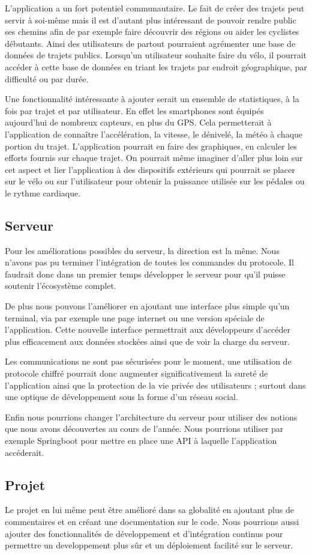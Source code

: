 L'application a un fort potentiel communautaire. Le fait de créer des trajets peut servir à soi-même mais il est d'autant plus intéressant
de pouvoir rendre public ses chemins afin de par exemple faire découvrir des régions ou aider les cyclistes débutants. Ainsi des utilisateurs
de partout pourraient agrémenter une base de données de trajets publics. Lorsqu'un utilisateur souhaite faire du vélo, il pourrait accéder
à cette base de données en triant les trajets par endroit géographique, par difficulté ou par durée.

Une fonctionnalité intéressante à ajouter serait un ensemble de statistiques, à la fois par trajet et par utilisateur. En effet les smartphones
sont équipés aujourd'hui de nombreux capteurs, en plus du GPS. Cela permetterait à l'application de connaître l'accélération, la vitesse, le
dénivelé, la météo à chaque portion du trajet. L'application pourrait en faire des graphiques, en calculer les efforts fournis sur chaque trajet.
On pourrait même imaginer d'aller plus loin sur cet aspect et lier l'application à des dispositifs extérieurs qui pourrait se placer sur le
vélo ou sur l'utilisateur pour obtenir la puissance utilisée sur les pédales ou le rythme cardiaque.
\subsection{Serveur}
Pour les améliorations possibles du serveur, la direction est la même. Nous n'avons pas pu terminer l'intégration de toutes les commandes du protocole.
Il faudrait donc dans un premier temps développer le serveur pour qu'il puisse soutenir l'écosystème complet.
\par
De plus nous pouvons l'améliorer en ajoutant une interface plus simple qu'un terminal, via par exemple une page internet ou une version spéciale de l'application.
Cette nouvelle interface permettrait aux développeurs d'accéder plus efficacement aux données stockées ainsi que de voir la charge du serveur.
\par
Les communications ne sont pas sécurisées pour le moment, une utilisation de protocole chiffré pourrait donc augmenter significativement la sureté de l'application ainsi que la protection de la vie privée des utilisateurs ; surtout dans une optique de développement sous la forme d'un réseau social.
\par
Enfin nous pourrions changer l'architecture du serveur pour utiliser des notions que nous avons découvertes au cours de l'année. Nous pourrions utiliser par exemple Springboot pour mettre en place une API à laquelle l'application accéderait.

\subsection{Projet}
Le projet en lui même peut être amélioré dans sa globalité en ajoutant plus de commentaires et en créant une documentation sur le code.
Nous pourrions aussi ajouter des fonctionnalités de développement et d'intégration continus pour permettre un developpement plus sûr et un déploiement facilité sur le serveur.